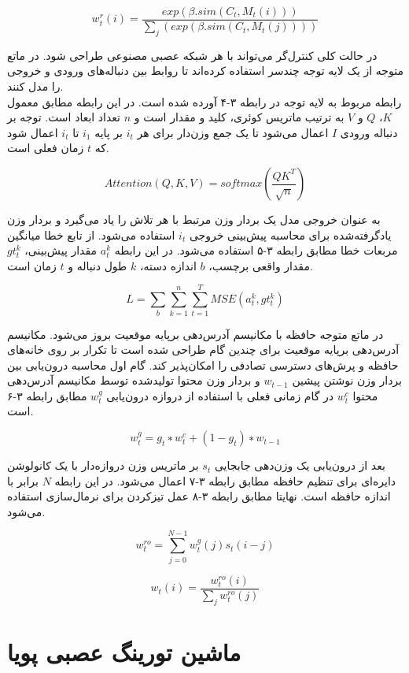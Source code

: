 \begin{equation}
w_t^r(i) = \frac{exp(\beta.sim(C_t,M_t(i)))}{\sum_j(exp(\beta.sim(C_t,M_t(j))))}
\end{equation}

در حالت کلی کنترل‌گر می‌تواند با هر شبکه عصبی مصنوعی طراحی شود. در ماتع متوجه از یک لایه توجه چندسر استفاده کرده‌اند تا روابط بین دنباله‌های ورودی و خروجی را مدل کنند. \cite{zhao2020cold}
\\

رابطه مربوط به لایه توجه در رابطه ۳-۴ آورده شده است. در این رابطه مطابق معمول $K$، $Q$ و $V$ به ترتیب ماتریس کوئری، کلید و مقدار است و $n$ تعداد ابعاد است. توجه بر دنباله ورودی $I$ اعمال می‌شود تا یک جمع وزن‌دار برای هر $i_t$ بر پایه $i_1$ تا $i_t$ اعمال شود که $t$ زمان فعلی است.\cite{zhao2020cold} 

\begin{equation}
Attention(Q,K,V) = softmax(\frac{QK^T}{\sqrt{n}})
\end{equation}

به عنوان خروجی مدل یک بردار وزن مرتبط با هر تلاش را یاد می‌گیرد و بردار وزن یادگرفته‌شده برای محاسبه پیش‌بینی خروجی $i_t$ استفاده می‌شود. از تابع خطا میانگین مربعات خطا مطابق رابطه ۳-۵ استفاده می‌شود. در این رابطه $a_t^k$ مقدار پیش‌بینی، $gt_t^k$ مقدار واقعی برچسب، $b$ اندازه دسته، $k$ طول دنباله و $t$ زمان است.\cite{zhao2020cold}

\begin{equation}
L = \sum_b \sum_{k=1}^n \sum_{t=1}^T MSE(a_t^k, gt_t^k)
\end{equation}

در ماتع متوجه حافظه با مکانیسم آدرس‌دهی برپایه موقعیت بروز می‌شود. مکانیسم آدرس‌دهی برپایه موقعیت برای چندین گام طراحی شده است تا تکرار بر روی خانه‌های حافظه و پرش‌های دسترسی تصادفی را امکان‌پذیر کند. گام اول محاسبه درون‌یابی بین بردار وزن نوشتن پیشین $w_{t-1}$ و بردار وزن محتوا تولیدشده توسط مکانیسم آدرس‌دهی محتوا $w_t^c$ در گام زمانی فعلی با استفاده از دروازه درون‌یابی $w_t^g$ مطابق رابطه ۳-۶ است.\cite{zhao2020cold}

\begin{equation}
w^g_t = g_t ∗ w^c_t + (1−g_t) ∗ w_{t−1}
\end{equation}

بعد از درون‌یابی یک وزن‌دهی جابجایی $s_t$ بر ماتریس وزن دروازه‌دار با یک کانولوشن دایره‌ای برای تنظیم حافظه مطابق رابطه ۳-۷ اعمال می‌شود. در این رابطه $N$ برابر با اندازه حافظه است. نهایتا مطابق رابطه ۳-۸ عمل تیزکردن برای نرمال‌سازی استفاده می‌شود.\cite{zhao2020cold}

\begin{equation}
w_t^{ro} = \sum_{j=0}^{N-1}w_t^g(j)s_t(i-j)
\end{equation}

\begin{equation}
w_t(i) = \frac{w_t^{ro}(i)}{\sum_j w_t^{ro}(j)}
\end{equation}

\section{ماشین تورینگ عصبی پویا}
